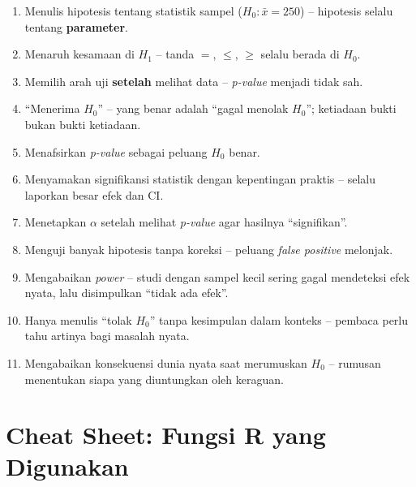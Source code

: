 \documentclass[
  indonesian,
  letterpaper,
]{book}
\providecommand{\tightlist}{%
  \setlength{\itemsep}{0pt}\setlength{\parskip}{0pt}}
\begin{document}
\begin{enumerate}
\def\labelenumi{\arabic{enumi}.}
\tightlist
\item
  Menulis hipotesis tentang statistik sampel (\(H_0: \bar{x} = 250\)) --
  hipotesis selalu tentang \textbf{parameter}.
\item
  Menaruh kesamaan di \(H_1\) -- tanda \(=\), \(\le\), \(\ge\) selalu
  berada di \(H_0\).
\item
  Memilih arah uji \textbf{setelah} melihat data -- \emph{p-value}
  menjadi tidak sah.
\item
  ``Menerima \(H_0\)'' -- yang benar adalah ``gagal menolak \(H_0\)'';
  ketiadaan bukti bukan bukti ketiadaan.
\item
  Menafsirkan \emph{p-value} sebagai peluang \(H_0\) benar.
\item
  Menyamakan signifikansi statistik dengan kepentingan praktis -- selalu
  laporkan besar efek dan CI.
\item
  Menetapkan \(\alpha\) setelah melihat \emph{p-value} agar hasilnya
  ``signifikan''.
\item
  Menguji banyak hipotesis tanpa koreksi -- peluang \emph{false
  positive} melonjak.
\item
  Mengabaikan \emph{power} -- studi dengan sampel kecil sering gagal
  mendeteksi efek nyata, lalu disimpulkan ``tidak ada efek''.
\item
  Hanya menulis ``tolak \(H_0\)'' tanpa kesimpulan dalam konteks --
  pembaca perlu tahu artinya bagi masalah nyata.
\item
  Mengabaikan konsekuensi dunia nyata saat merumuskan \(H_0\) -- rumusan
  menentukan siapa yang diuntungkan oleh keraguan.
\end{enumerate}

\section{Cheat Sheet: Fungsi R yang
Digunakan}\label{cheat-sheet-fungsi-r-yang-digunakan-1}
\end{document}
